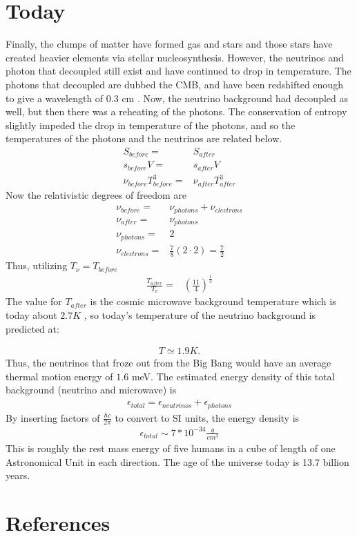 \documentclass[12pt]{article}
\theoremstyle{plain}
\theoremstyle{definition}
\begin{document}
\section{Today}
\hspace{0.2in} Finally, the clumps of matter have formed gas and stars and those stars have created heavier elements via stellar nucleosynthesis. However, the neutrinos and photon that decoupled still exist and have continued to drop in temperature. The photons that decoupled are dubbed the CMB, and have been redshifted enough to give a wavelength of $0.3$ cm \cite{Penzias:1965wn}.
Now, the neutrino background had decoupled as well, but then there was a reheating of the photons. The conservation of entropy slightly impeded the drop in temperature of the photons, and so the temperatures of the photons and the neutrinos are related below.
\begin{align*}
S_{before}=& S_{after} \\
s_{before}V=& s_{after}V \\
\nu_{before} T_{before}^{3}=&\nu_{after} T_{after}^{3}
\end{align*}
Now the relativistic degrees of freedom are
\begin{align*}
\nu_{before} =& \nu_{photons}+\nu_{electrons} \\
\nu_{after} =& \nu_{photons} \\
\nu_{photons}=& 2 \\
\nu_{electrons}=& \frac{7}{8} (2\cdot2) = \frac{7}{2}
\end{align*}
Thus, utilizing $T_{\nu}=T_{before}$ 
\begin{align*}
\frac{T_{after}}{T_{\nu}}=&\left(\frac{11}{4}\right)^{\frac{1}{3}}
\end{align*}
The value for $T_{after}$ is the cosmic microwave background temperature which is today about $2.7K$ \cite{Penzias:1965wn}, so today's temperature of the neutrino background is predicted at:

\begin{align*}
T\simeq 1.9K .
\end{align*}
Thus, the neutrinos that froze out from the Big Bang would have an average thermal motion energy of $1.6$ meV. The estimated energy density of this total background (neutrino and microwave) is 
\begin{align*}
\epsilon_{total}=\epsilon_{neutrinos}+\epsilon_{photons}
\end{align*}
By inserting factors of $\frac{hc}{2\pi}$ to convert to SI units, the energy density is
\begin{align*}
\epsilon_{total}\sim  7*10^{-34}\frac{g}{cm^{3}}
\end{align*}
This is roughly the rest mass energy of five humans in a cube of length of one Astronomical Unit in each direction. The age of the universe today is 13.7 billion years. 

\section{References}
{}

 
 
\end{document}
